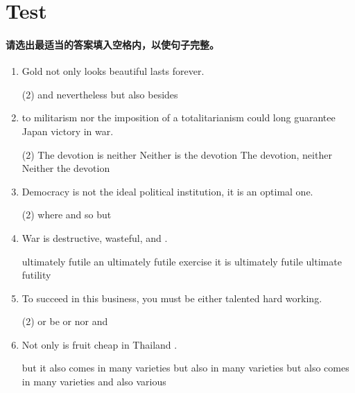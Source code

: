 \section{Test}

\paragraph{请选出最适当的答案填入空格内，以使句子完整。}

\begin{enumerate}
\item Gold not only looks beautiful \ttu lasts forever.
\begin{tasks}(2)
  \task and
  \task nevertheless
  \task but also
  \task besides
\end{tasks}

\item \ttu to militarism nor the imposition of a totalitarianism could long guarantee Japan victory in war.
\begin{tasks}(2)
  \task The devotion is neither
  \task Neither is the devotion
  \task The devotion, neither
  \task Neither the devotion
\end{tasks}

\item Democracy is not the ideal political institution, \ttu it is an optimal one.
\begin{tasks}(2)
  \task where
  \task and
  \task so
  \task but
\end{tasks}

\item War is destructive, wasteful, and \ttu.
\begin{tasks}
  \task ultimately futile
  \task an ultimately futile exercise
  \task it is ultimately futile
  \task ultimate futility
\end{tasks}

\item To succeed in this business, you must be either talented \ttu hard working.
\begin{tasks}(2)
  \task or be
  \task or
  \task nor
  \task and
\end{tasks}

\item Not only is fruit cheap in Thailand \ttu.
\begin{tasks}
  \task but it also comes in many varieties
  \task but also in many varieties
  \task but also comes in many varieties
  \task and also various
\end{tasks}


\end{enumerate}
